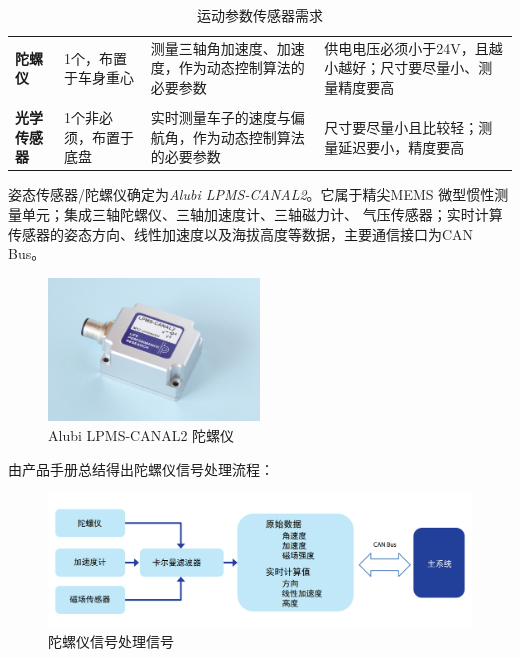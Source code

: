 \begin{table}[H]
	\centering%
	\caption[centering]{运动参数传感器需求}%
	\label{ydxq}%
	\begin{tabular}{C{2cm}C{3cm}p{3cm}p{4cm}}	
		\toprule
		 & & &\\ 
		\midrule
		
		\textbf{陀螺仪} & 1个，布置于车身重心 & 测量三轴角加速度、加速度，作为动态控制算法的必要参数 & 供电电压必须小于24V，且越小越好；尺寸要尽量小、测量精度要高 \\
		\\
		\textbf{光学传感器} & 1个非必须，布置于底盘 & 实时测量车子的速度与偏航角，作为动态控制算法的必要参数 & 尺寸要尽量小且比较轻；测量延迟要小，精度要高\\	
		
		\bottomrule
	\end{tabular}
\end{table}

姿态传感器/陀螺仪确定为\emph{Alubi LPMS-CANAL2}。它属于精尖MEMS 微型惯性测量单元；集成三轴陀螺仪、三轴加速度计、三轴磁力计、 气压传感器；实时计算传感器的姿态方向、线性加速度以及海拔高度等数据，主要通信接口为CAN Bus。

\begin{figure}[H]
	\centering
	\includegraphics[width = 0.5\textwidth]{fig/tly.png}
	\caption{Alubi LPMS-CANAL2 陀螺仪}
	\label{tly}
\end{figure}

由产品手册总结得出陀螺仪信号处理流程：

\begin{figure}[H]
	\centering
	\includegraphics[width = 1\textwidth]{fig/tly_pipeline.png}
	\caption{陀螺仪信号处理信号}
	\label{tly_pipeline}
\end{figure}

